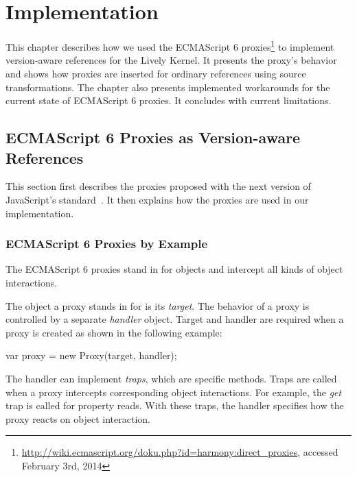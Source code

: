 

\chapter{Implementation} \label{chapter:IMPLEMENTATION}

This chapter describes how we used the ECMAScript 6 proxies\footnote{\url{http://wiki.ecmascript.org/doku.php?id=harmony:direct_proxies}, accessed February 3rd, 2014} to implement version-aware references for the Lively Kernel.
It presents the proxy's behavior and shows how proxies are inserted for ordinary references using source transformations.
The chapter also presents implemented workarounds for the current state of ECMAScript 6 proxies.
It concludes with current limitations.

\section{ECMAScript 6 Proxies as Version-aware References} \label{sec:IMPLEMENTATION:1}

This section first describes the proxies proposed with the next version of JavaScript's standard~\cite{Ecma2014ES6}.
It then explains how the proxies are used in our implementation.

\subsection{ECMAScript 6 Proxies by Example}

The ECMAScript 6 proxies stand in for objects and intercept all kinds of object interactions.

The object a proxy stands in for is its \emph{target}.
The behavior of a proxy is controlled by a separate \emph{handler} object.
Target and handler are required when a proxy is created as shown in the following example:

\begin{code}{}{}
var proxy = new Proxy(target, handler);
\end{code}
\iffalse
\end{verbatim}\fi

The handler can implement \emph{traps}, which are specific methods.
Traps are called when a proxy intercepts corresponding object interactions.
For example, the \emph{get} trap is called for property reads.
With these traps, the handler specifies how the proxy reacts on object interaction.

